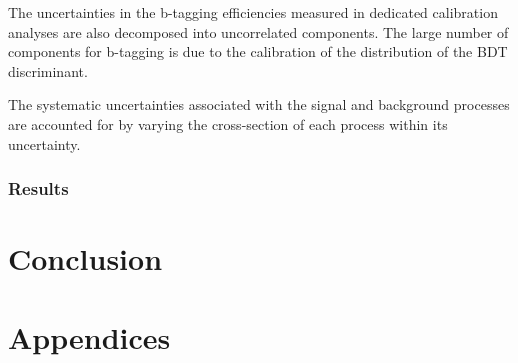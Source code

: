 \documentclass[NOTE, atlasdraft=true, texlive=2016, UKenglish]{\ATLASLATEXPATH atlasdoc}
\begin{document}
The uncertainties in the b-tagging efficiencies measured in dedicated calibration analyses \cite{btag_cal} are also decomposed into uncorrelated components. The large number of components for b-tagging is due to the calibration of the distribution of the BDT discriminant.  

The systematic uncertainties associated with the signal and background processes are accounted for by varying the cross-section of each process within its uncertainty.

                                                                
\section{Results}
\label{sec:results}






\part{Conclusion}
\label{part:conclusion}



\printbibliography
%
%

\clearpage
{}


\clearpage
\appendix
\part*{Appendices}

\section{}
\end{document}
